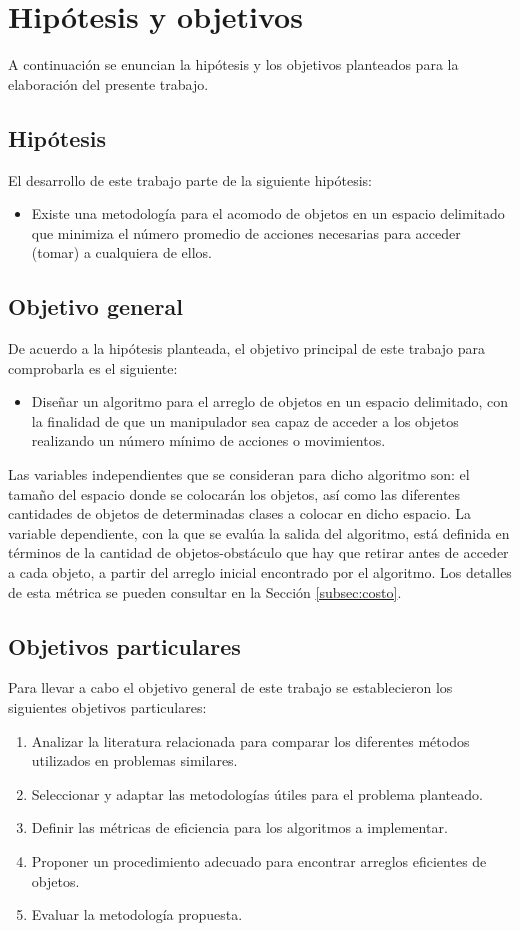 \section{Hipótesis y objetivos}
%
%
A continuación se enuncian la hipótesis y los objetivos planteados para la elaboración del presente trabajo.
%
%
\subsection{Hipótesis}
%
%
El desarrollo de este trabajo parte de la siguiente hipótesis:
%
\begin{itemize}[label = $\blacktriangleright$]
	\item Existe una metodología para el acomodo de objetos en un espacio delimitado que minimiza el número promedio de acciones necesarias para acceder (tomar) a cualquiera de ellos.
\end{itemize}
%
%
\subsection{Objetivo general}
%
%
De acuerdo a la hipótesis planteada, el objetivo principal de este trabajo para comprobarla es el siguiente:
%
{
\begin{itemize}[label = $\blacktriangleright$]
	\item Diseñar un algoritmo para el arreglo de objetos en un espacio delimitado, con la finalidad de que un manipulador sea capaz de acceder a los objetos realizando un número mínimo de acciones o movimientos.
\end{itemize}}
%
\noindent Las variables independientes que se consideran para dicho algoritmo son: el tamaño del espacio donde se colocarán los objetos, así como las diferentes cantidades de objetos de determinadas clases a colocar en dicho espacio.
La variable dependiente, con la que se evalúa la salida del algoritmo, está definida en términos de la cantidad de objetos-obstáculo que hay que retirar antes de acceder a cada objeto, a partir del arreglo inicial encontrado por el algoritmo.
Los detalles de esta métrica se pueden consultar en la Sección \ref{subsec:costo}.
%
%
\subsection{Objetivos particulares}
%
%
Para llevar a cabo el objetivo general de este trabajo se establecieron los siguientes objetivos particulares:
%
\begin{enumerate}
	\item Analizar la literatura relacionada para comparar los diferentes métodos utilizados en problemas similares.
	\item Seleccionar y adaptar las metodologías útiles para el problema planteado.
	\item Definir las métricas de eficiencia para los algoritmos a implementar.
	\item Proponer un procedimiento adecuado para encontrar arreglos eficientes de objetos.
	\item Evaluar la metodología propuesta.
\end{enumerate}
%
%
